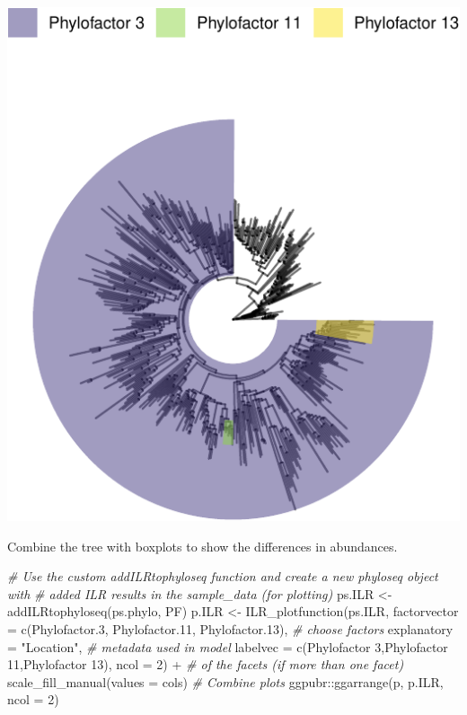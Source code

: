 \documentclass[
]{book}
\newenvironment{Shaded}{\begin{snugshade}}{\end{snugshade}}
\newcommand{\AttributeTok}[1]{\textcolor[rgb]{0.77,0.63,0.00}{#1}}
\newcommand{\CommentTok}[1]{\textcolor[rgb]{0.56,0.35,0.01}{\textit{#1}}}
\newcommand{\DecValTok}[1]{\textcolor[rgb]{0.00,0.00,0.81}{#1}}
\newcommand{\FunctionTok}[1]{\textcolor[rgb]{0.00,0.00,0.00}{#1}}
\newcommand{\NormalTok}[1]{#1}
\newcommand{\OtherTok}[1]{\textcolor[rgb]{0.56,0.35,0.01}{#1}}
\newcommand{\SpecialCharTok}[1]{\textcolor[rgb]{0.00,0.00,0.00}{#1}}
\newcommand{\StringTok}[1]{\textcolor[rgb]{0.31,0.60,0.02}{#1}}
\begin{document}
\includegraphics{gitbook-demo_files/figure-latex/blacktree4-1.pdf}

Combine the tree with boxplots to show the differences in abundances.

\begin{Shaded}
\begin{Highlighting}[]
\CommentTok{\# Use the custom addILRtophyloseq function and create a new phyloseq object with }
\CommentTok{\# added ILR results in the sample\_data (for plotting)}
\NormalTok{ps.ILR }\OtherTok{\textless{}{-}} \FunctionTok{addILRtophyloseq}\NormalTok{(ps.phylo, PF)}
\NormalTok{p.ILR }\OtherTok{\textless{}{-}} \FunctionTok{ILR\_plotfunction}\NormalTok{(ps.ILR,}
                \AttributeTok{factorvector =} \FunctionTok{c}\NormalTok{(}\StringTok{\textquotesingle{}Phylofactor.3\textquotesingle{}}\NormalTok{, }\StringTok{\textquotesingle{}Phylofactor.11\textquotesingle{}}\NormalTok{, }\StringTok{\textquotesingle{}Phylofactor.13\textquotesingle{}}\NormalTok{),  }\CommentTok{\# choose factors }
                \AttributeTok{explanatory =} \StringTok{"Location"}\NormalTok{,  }\CommentTok{\# metadata used in model}
                \AttributeTok{labelvec =} \FunctionTok{c}\NormalTok{(}\StringTok{\textquotesingle{}Phylofactor 3\textquotesingle{}}\NormalTok{,}\StringTok{\textquotesingle{}Phylofactor 11\textquotesingle{}}\NormalTok{,}\StringTok{\textquotesingle{}Phylofactor 13\textquotesingle{}}\NormalTok{),}
                \AttributeTok{ncol =} \DecValTok{2}\NormalTok{)  }\SpecialCharTok{+} \CommentTok{\# of the facets (if more than one facet) }
          \FunctionTok{scale\_fill\_manual}\NormalTok{(}\AttributeTok{values =}\NormalTok{ cols)}
\CommentTok{\# Combine plots}
\NormalTok{ggpubr}\SpecialCharTok{::}\FunctionTok{ggarrange}\NormalTok{(p, p.ILR, }\AttributeTok{ncol =} \DecValTok{2}\NormalTok{)}
\end{Highlighting}
\end{Shaded}
\end{document}
